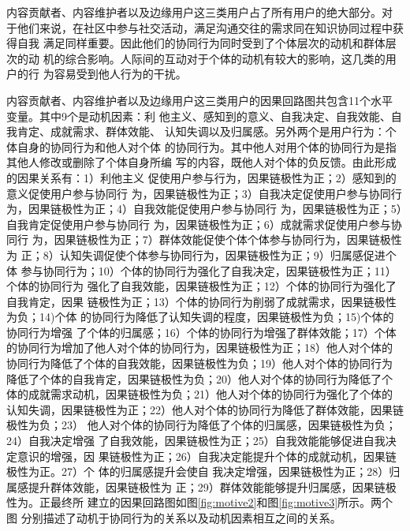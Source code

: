 内容贡献者、内容维护者以及边缘用户这三类用户占了所有用户的绝大部分。对
于他们来说，在社区中参与社交活动，满足沟通交往的需求同在知识协同过程中获得自我
满足同样重要。因此他们的协同行为同时受到了个体层次的动机和群体层次的动
机的综合影响。人际间的互动对于个体的动机有较大的影响，这几类的用户的行
为容易受到他人行为的干扰。

内容贡献者、内容维护者以及边缘用户这三类用户的因果回路图共包含11个水平
变量。其中9个是动机因素：利
他主义、感知到的意义、自我决定、自我效能、自我肯定、成就需求、群体效能、
认知失调以及归属感。另外两个是用户行为：个体自身的协同行为和他人对个体
的协同行为。其中他人对用个体的协同行为是指其他人修改或删除了个体自身所编
写的内容，既他人对个体的负反馈。由此形成的因果关系有：1）利他主义
促使用户参与行为，因果链极性为正；2）感知到的意义促使用户参与协同行
为，因果链极性为正；3）自我决定促使用户参与协同行
为，因果链极性为正；4）自我效能促使用户参与协同行
为，因果链极性为正；5）自我肯定促使用户参与协同行
为，因果链极性为正；6）成就需求促使用户参与协同行
为，因果链极性为正；7）群体效能促使个体个体参与协同行为，因果链极性为
正；8）认知失调促使个体参与协同行为，因果链极性为正；9）归属感促进个体
参与协同行为；10）个体的协同行为强化了自我决定，因果链极性为正；11）个体的协同行为
强化了自我效能，因果链极性为正；12）个体的协同行为强化了自我肯定，因果
链极性为正；13）个体的协同行为削弱了成就需求，因果链极性为负；14)个体
的协同行为降低了认知失调的程度，因果链极性为负；15)个体的协同行为增强
了个体的归属感；16）个体的协同行为增强了群体效能；17）个体
的协同行为增加了他人对个体的协同行为，因果链极性为正；18）他人对个体的
协同行为降低了个体的自我效能，因果链极性为负；19）他人对个体的协同行为
降低了个体的自我肯定，因果链极性为负；20）他人对个体的协同行为降低了个
体的成就需求动机，因果链极性为负；21）他人对个体的协同行为强化了个体的
认知失调，因果链极性为正；22）他人对个体的协同行为降低了群体效能，因果链极性为负；23）
他人对个体的协同行为降低了个体的归属感，因果链极性为负；24）自我决定增强
了自我效能，因果链极性为正；25）自我效能能够促进自我决定意识的增强，因
果链极性为正；26）自我决定能提升个体的成就动机，因果链极性为正。27）个
体的归属感提升会使自
我决定增强，因果链极性为正；28）归属感提升群体效能，因果链极性为
正；29）群体效能能够提升归属感，因果链极性为。正最终所
建立的因果回路图如图\ref{fig:motive2}和图\ref{fig:motive3}所示。两个图
分别描述了动机于协同行为的关系以及动机因素相互之间的关系。

